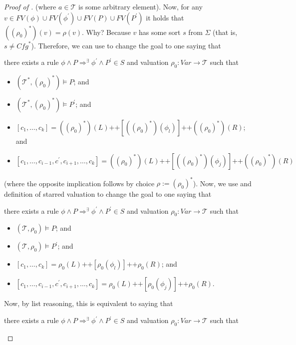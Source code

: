 \begin{proof}[Proof of ]
(where $a \in \mathcal{T}$ is some arbitrary element).
Now, for any $v \in \mathit{FV}(\phi) \cup \mathit{FV}(\phi^\prime) \cup \mathit{FV}(P) \cup \mathit{FV}(P^\prime)$ it holds that
$((\rho_0)^*)(v) = \rho(v)$.
Why? Because $v$ has some sort $s$ from $\Sigma$
(that is, $s \not = \mathit{Cfg}^*$).
Therefore, we can use  to change the goal to one saying that
\begin{proofenv}
there exists a rule $\phi \land P \Rightarrow^\exists \phi^\prime \land P^\prime \in S$
and valuation $\rho_0 : \mathit{Var} \to \mathcal{T}$ such that
\begin{itemize}
    \item $(\mathcal{T}^*, (\rho_0)^*) \vDash P$; and
    \item $(\mathcal{T}^*, (\rho_0)^*) \vDash P^\prime$; and
    \item $[c_1,\ldots,c_k] = ((\rho_0)^*)(L) \texttt{++} [((\rho_0)^*)(\phi_l)] \texttt{++} ((\rho_0)^*)(R)$; and
    \item $[c_1, \ldots, c_{i-1}, c^\prime, c_{i+1}, \ldots, c_k] = ((\rho_0)^*)(L)
    \texttt{++} [((\rho_0)^*)(\phi_j)] 
    \texttt{++} ((\rho_0)^*)(R)$
\end{itemize}
\end{proofenv}
(where the opposite implication follows by choice $\rho := (\rho_0)^*$).
Now, we use  and definition of starred valuation to change the goal to one saying that
\begin{proofenv}
there exists a rule $\phi \land P \Rightarrow^\exists \phi^\prime \land P^\prime \in S$
and valuation $\rho_0 : \mathit{Var} \to \mathcal{T}$ such that
\begin{itemize}
    \item $(\mathcal{T}, \rho_0) \vDash P$; and
    \item $(\mathcal{T}, \rho_0) \vDash P^\prime$; and
    \item $[c_1,\ldots,c_k] = \rho_0(L) \texttt{++} [\rho_0(\phi_l)] \texttt{++} \rho_0(R)$; and
    \item $[c_1, \ldots, c_{i-1}, c^\prime, c_{i+1}, \ldots, c_k] = \rho_0(L)
    \texttt{++} [\rho_0(\phi_j)] 
    \texttt{++} \rho_0(R)$.
\end{itemize}
\end{proofenv}
Now, by list reasoning, this is equivalent to
saying that
\begin{proofenv}
there exists a rule $\phi \land P \Rightarrow^\exists \phi^\prime \land P^\prime \in S$
and valuation $\rho_0 : \mathit{Var} \to \mathcal{T}$ such that

\end{proofenv}
\end{proof}
